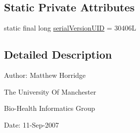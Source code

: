 \subsection*{Static Private Attributes}
\begin{DoxyCompactItemize}
\item 
static final long \hyperlink{classorg_1_1semanticweb_1_1owlapi_1_1expression_1_1_parser_exception_a3af593cbc85db3ee83d6990c2e3e8ead}{serial\-Version\-U\-I\-D} = 30406\-L
\end{DoxyCompactItemize}


\subsection{Detailed Description}
Author\-: Matthew Horridge\par
 The University Of Manchester\par
 Bio-\/\-Health Informatics Group\par
 Date\-: 11-\/\-Sep-\/2007\par
 \par
 

